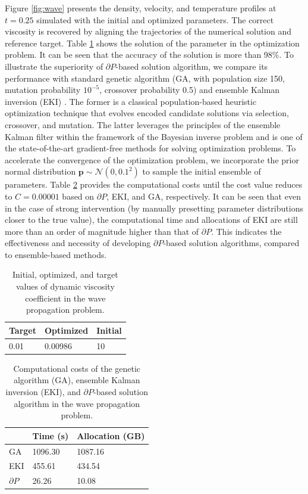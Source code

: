\documentclass[preprint,3p,12pt,sort&compress]{elsarticle}
\begin{document}
Figure \ref{fig:wave} presents the density, velocity, and temperature profiles at $t=0.25$ simulated with the initial and optimized parameters.
The correct viscosity is recovered by aligning the trajectories of the numerical solution and reference target.
Table \ref{tab:wave value} shows the solution of the parameter in the optimization problem.
It can be seen that the accuracy of the solution is more than 98\%.
To illustrate the superiority of $\partial P$-based solution algorithm, we compare its performance with standard genetic algorithm (GA, with population size 150, mutation probability $10^{-5}$, crossover probability 0.5) and ensemble Kalman inversion (EKI) \cite{iglesias2013ensemble,kovachki2019ensemble}.
The former is a classical population-based heuristic optimization technique that evolves encoded candidate solutions via selection, crossover, and mutation.
The latter leverages the principles of the ensemble Kalman filter within the framework of the Bayesian inverse problem and is one of the state-of-the-art gradient-free methods for solving optimization problems.
To accelerate the convergence of the optimization problem, we incorporate the prior normal distribution $\mathbf p \sim \mathcal N(0,0.1^2)$ to sample the initial ensemble of parameters.
Table \ref{tab:wave cost} provides the computational costs until the cost value reduces to $C=0.00001$ based on $\partial P$, EKI, and GA, respectively.
It can be seen that even in the case of strong intervention (by manually presetting parameter distributions closer to the true value), the computational time and allocations of EKI are still more than an order of magnitude higher than that of $\partial P$.
This indicates the effectiveness and necessity of developing $\partial P$-based solution algorithms, compared to ensemble-based methods.

\begin{table}[h]
    \centering
    \caption{Initial, optimized, and target values of dynamic viscosity coefficient in the wave propagation problem.}
    \begin{tabular}{lll}
        \toprule
        Target & Optimized & Initial \\
        \midrule
        0.01 & 0.00986 & 10 \\
        \bottomrule
    \end{tabular}
    \label{tab:wave value}
\end{table}

\begin{table}[h]
    \centering
    \caption{Computational costs of the genetic algorithm (GA), ensemble Kalman inversion (EKI), and $\partial P$-based solution algorithm in the wave propagation problem.}
    \begin{tabular}{lll}
        \toprule
        & Time (s) & Allocation (GB) \\
        \midrule
        GA & 1096.30 & 1087.16 \\
        EKI & 455.61 & 434.54 \\
        $\partial P$ & 26.26 & 10.08 \\
        \bottomrule
    \end{tabular}
    \label{tab:wave cost}
\end{table}
\end{document}
